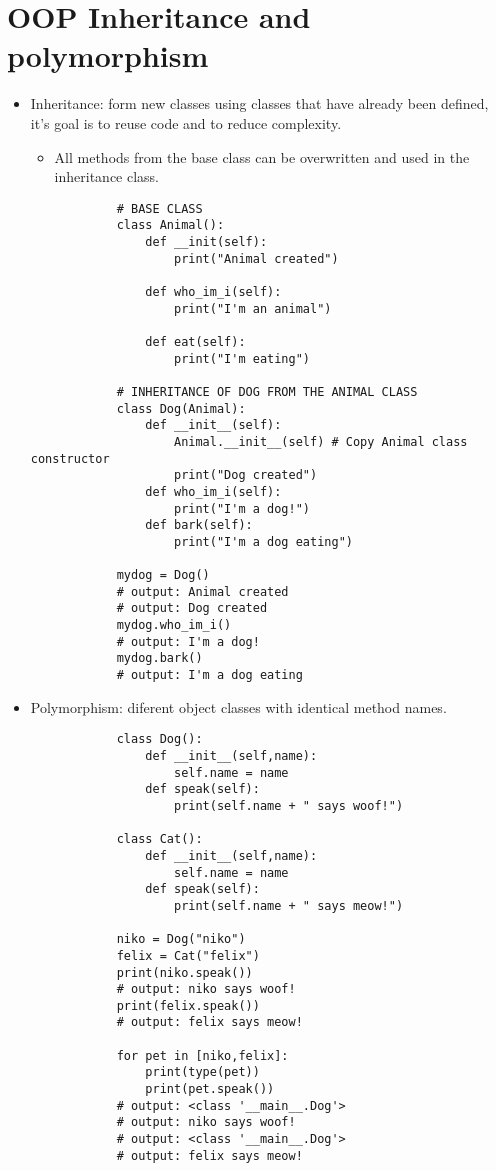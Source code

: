 \section{OOP Inheritance and polymorphism}
\begin{itemize}
    \item Inheritance: form new classes using classes that have already been defined, it's goal is to reuse code and to reduce complexity. 
        \begin{itemize}
            \item All methods from the base class can be overwritten and used in the inheritance class. 
        \end{itemize}
        \begin{verbatim}
            # BASE CLASS
            class Animal():
                def __init(self):
                    print("Animal created")
                
                def who_im_i(self):
                    print("I'm an animal")
                
                def eat(self):
                    print("I'm eating")

            # INHERITANCE OF DOG FROM THE ANIMAL CLASS
            class Dog(Animal):
                def __init__(self): 
                    Animal.__init__(self) # Copy Animal class constructor
                    print("Dog created")
                def who_im_i(self):
                    print("I'm a dog!")
                def bark(self):
                    print("I'm a dog eating")

            mydog = Dog()
            # output: Animal created
            # output: Dog created
            mydog.who_im_i()
            # output: I'm a dog!
            mydog.bark()
            # output: I'm a dog eating
        \end{verbatim}
    
    \item Polymorphism: diferent object classes with identical method names. 
        \begin{verbatim}
            class Dog():
                def __init__(self,name):
                    self.name = name 
                def speak(self):
                    print(self.name + " says woof!")

            class Cat():
                def __init__(self,name):
                    self.name = name 
                def speak(self):
                    print(self.name + " says meow!")

            niko = Dog("niko")
            felix = Cat("felix")
            print(niko.speak())
            # output: niko says woof!
            print(felix.speak())
            # output: felix says meow!

            for pet in [niko,felix]:
                print(type(pet))
                print(pet.speak())
            # output: <class '__main__.Dog'>
            # output: niko says woof!
            # output: <class '__main__.Dog'>
            # output: felix says meow!
        \end{verbatim}
\end{itemize}
